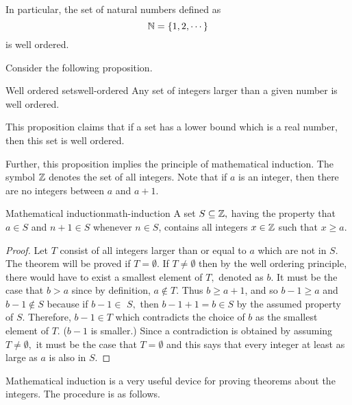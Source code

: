 In particular, the set of natural numbers defined as
\begin{equation*}
\mathbb{N} = \left\{1,2,\cdots \right\}
\end{equation*}
is well ordered.

Consider the following proposition.

\begin{proposition}{Well ordered sets}{well-ordered}
Any set of integers larger than a given number is well ordered.
\end{proposition}

This proposition claims that if a set has a lower bound which is a real number, 
then this set is well ordered.

Further, this proposition implies the principle of mathematical induction. The symbol $\mathbb{Z}$ denotes the set of all
integers. Note that if $a$ is an integer, then there are no integers between
$a$ and $a+1.$

\begin{theorem}{Mathematical induction}{math-induction}
 A set $S\subseteq \mathbb{Z},$ having
the property that $a\in S$ and $n+1\in S$ whenever $n\in S$, contains all
integers $x\in \mathbb{Z}$ such that $x\geq a.$
\end{theorem}

\begin{proof} 
Let $T$ consist of all integers larger than or equal to $a$
which are not in $S.$ The theorem will be proved if $T=\emptyset .$ If 
$T\neq \emptyset $ then by the well ordering principle, there would have to
exist a smallest element of $T,$ denoted as $b.$ It must be the case that 
$b>a$ since by definition, $a\notin T.$ Thus $b\geq a+1$, and so $b-1\geq a$
and $b-1\notin S$ because if $b-1\in $ $S,$ then $b-1+1=b\in S$ by the
assumed property of $S.$ Therefore, $b-1\in T$ which contradicts the choice
of $b$ as the smallest element of $T.$ ($b-1$ is smaller.) Since a
contradiction is obtained by assuming $T\neq \emptyset ,$ it must be the
case that $T=\emptyset $ and this says that every integer at least as large
as $a$ is also in $S$.
\end{proof}

Mathematical induction is a very useful device for proving theorems about
the integers. The procedure is as follows.

